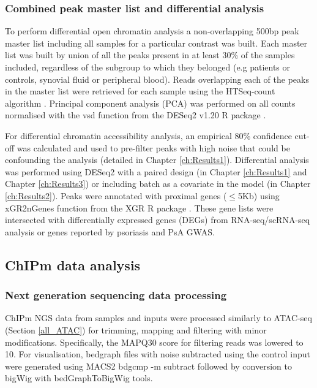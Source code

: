 \subsubsection{Combined peak master list and differential analysis}
To perform differential open chromatin analysis a non-overlapping 500bp peak master list including all samples for a particular contrast was built. Each master list was built by union of all the peaks present in at least 30\% of the samples included, regardless of the subgroup to which they belonged (e.g patients or controls, synovial fluid or peripheral blood).  Reads overlapping each of the peaks in the master list were retrieved for each sample using the HTSeq-count algorithm \parencite{Anders2015}. Principal component analysis (PCA) was performed on all counts normalised with the vsd function from the DESeq2 v1.20 R package \parencite{Love2014}.

For differential chromatin accessibility analysis, an empirical 80\% confidence cut-off was calculated and used to pre-filter peaks with high noise that could be confounding the analysis (detailed in Chapter \ref{ch:Results1}). Differential analysis was performed using DESeq2 with a paired design (in Chapter \ref{ch:Results1} and Chapter \ref{ch:Results3}) or including batch as a covariate in the model (in Chapter \ref{ch:Results2}). Peaks were annotated with proximal genes ($\leq$5Kb) using xGR2nGenes function from the XGR R package \parencite{Fang2016}. These gene lists were intersected with differentially expressed genes (DEGs) from RNA-seq/scRNA-seq analysis or genes reported by psoriasis and PsA GWAS.





\subsection{ChIPm data analysis}

\subsubsection{Next generation sequencing data processing}
ChIPm NGS data from samples and inputs were processed similarly to ATAC-seq (Section \ref{all_ATAC}) for trimming, mapping and filtering with minor modifications. Specifically, the MAPQ30 score for filtering reads was lowered to 10. For visualisation, bedgraph files with noise subtracted using the control input were generated using MACS2 bdgcmp -m subtract followed by conversion to bigWig with bedGraphToBigWig tools.

